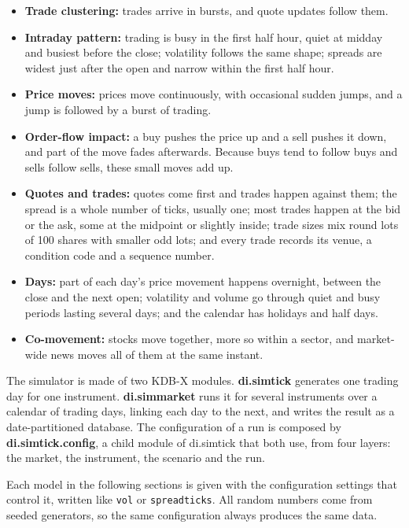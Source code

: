 \documentclass[11pt,a4paper]{article}
\newcommand{\key}[1]{\texttt{#1}}
\theoremstyle{paper}
\begin{document}
\begin{itemize}
\item \textbf{Trade clustering:} trades arrive in bursts, and quote updates follow them.
\item \textbf{Intraday pattern:} trading is busy in the first half hour, quiet at midday and busiest before the close; volatility follows the same shape; spreads are widest just after the open and narrow within the first half hour.
\item \textbf{Price moves:} prices move continuously, with occasional sudden jumps, and a jump is followed by a burst of trading.
\item \textbf{Order-flow impact:} a buy pushes the price up and a sell pushes it down, and part of the move fades afterwards. Because buys tend to follow buys and sells follow sells, these small moves add up.
\item \textbf{Quotes and trades:} quotes come first and trades happen against them; the spread is a whole number of ticks, usually one; most trades happen at the bid or the ask, some at the midpoint or slightly inside; trade sizes mix round lots of 100 shares with smaller odd lots; and every trade records its venue, a condition code and a sequence number.
\item \textbf{Days:} part of each day's price movement happens overnight, between the close and the next open; volatility and volume go through quiet and busy periods lasting several days; and the calendar has holidays and half days.
\item \textbf{Co-movement:} stocks move together, more so within a sector, and market-wide news moves all of them at the same instant.
\end{itemize}

The simulator is made of two KDB-X modules. \textbf{di.simtick} generates one trading day for one instrument. \textbf{di.simmarket} runs it for several instruments over a calendar of trading days, linking each day to the next, and writes the result as a date-partitioned database. The configuration of a run is composed by \textbf{di.simtick.config}, a child module of di.simtick that both use, from four layers: the market, the instrument, the scenario and the run.

Each model in the following sections is given with the configuration settings that control it, written like \key{vol} or \key{spreadticks}. All random numbers come from seeded generators, so the same configuration always produces the same data.
\end{document}
